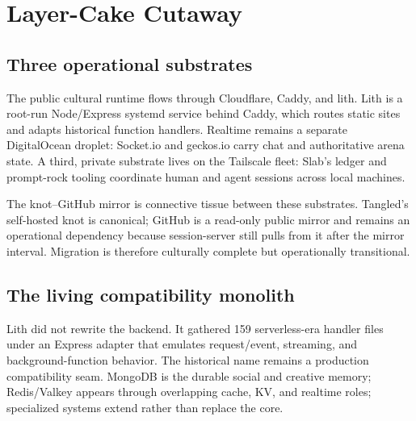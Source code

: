 \documentclass[10pt,letterpaper,twocolumn]{article}
\begin{document}

\section{Layer-Cake Cutaway}


\subsection{Three operational substrates}

The public cultural runtime flows through Cloudflare, Caddy, and lith. Lith is a root-run Node/Express systemd service behind Caddy, which routes static sites and adapts historical function handlers. Realtime remains a separate DigitalOcean droplet: Socket.io and geckos.io carry chat and authoritative arena state. A third, private substrate lives on the Tailscale fleet: Slab's ledger and prompt-rock tooling coordinate human and agent sessions across local machines.

The knot--GitHub mirror is connective tissue between these substrates. Tangled's self-hosted knot is canonical; GitHub is a read-only public mirror and remains an operational dependency because session-server still pulls from it after the mirror interval. Migration is therefore culturally complete but operationally transitional.

\subsection{The living compatibility monolith}

Lith did not rewrite the backend. It gathered 159 serverless-era handler files under an Express adapter that emulates request/event, streaming, and background-function behavior. The historical  name remains a production compatibility seam. MongoDB is the durable social and creative memory; Redis/Valkey appears through overlapping cache, KV, and realtime roles; specialized systems extend rather than replace the core.
\end{document}
